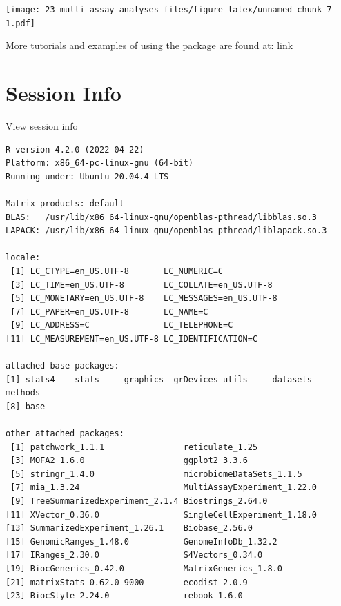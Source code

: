 \documentclass[
]{book}
\begin{document}
\texttt{[image: 23\_multi-assay\_analyses\_files/figure-latex/unnamed-chunk-7-1.pdf]}

More tutorials and examples of using the package are found at: \href{https://biofam.github.io/MOFA2/tutorials.html}{link}

\hypertarget{session-info-9}{%
\section*{Session Info}\label{session-info-9}}

View session info

\begin{verbatim}
R version 4.2.0 (2022-04-22)
Platform: x86_64-pc-linux-gnu (64-bit)
Running under: Ubuntu 20.04.4 LTS

Matrix products: default
BLAS:   /usr/lib/x86_64-linux-gnu/openblas-pthread/libblas.so.3
LAPACK: /usr/lib/x86_64-linux-gnu/openblas-pthread/liblapack.so.3

locale:
 [1] LC_CTYPE=en_US.UTF-8       LC_NUMERIC=C              
 [3] LC_TIME=en_US.UTF-8        LC_COLLATE=en_US.UTF-8    
 [5] LC_MONETARY=en_US.UTF-8    LC_MESSAGES=en_US.UTF-8   
 [7] LC_PAPER=en_US.UTF-8       LC_NAME=C                 
 [9] LC_ADDRESS=C               LC_TELEPHONE=C            
[11] LC_MEASUREMENT=en_US.UTF-8 LC_IDENTIFICATION=C       

attached base packages:
[1] stats4    stats     graphics  grDevices utils     datasets  methods  
[8] base     

other attached packages:
 [1] patchwork_1.1.1                reticulate_1.25               
 [3] MOFA2_1.6.0                    ggplot2_3.3.6                 
 [5] stringr_1.4.0                  microbiomeDataSets_1.1.5      
 [7] mia_1.3.24                     MultiAssayExperiment_1.22.0   
 [9] TreeSummarizedExperiment_2.1.4 Biostrings_2.64.0             
[11] XVector_0.36.0                 SingleCellExperiment_1.18.0   
[13] SummarizedExperiment_1.26.1    Biobase_2.56.0                
[15] GenomicRanges_1.48.0           GenomeInfoDb_1.32.2           
[17] IRanges_2.30.0                 S4Vectors_0.34.0              
[19] BiocGenerics_0.42.0            MatrixGenerics_1.8.0          
[21] matrixStats_0.62.0-9000        ecodist_2.0.9                 
[23] BiocStyle_2.24.0               rebook_1.6.0                  


\end{verbatim}
\end{document}
